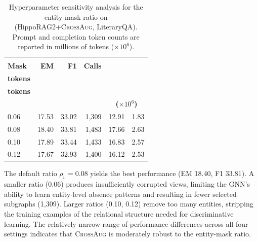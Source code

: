 \documentclass[11pt]{article}
\newcommand{\ours}{\textsc{CrossAug}\xspace}
\begin{document}
\begin{table}[!htbp]
\centering
\footnotesize
\setlength{\tabcolsep}{3pt}
\begin{tabular*}{\columnwidth}{@{\extracolsep{\fill}}lrrrrr@{}}
\toprule
\begin{tabular}[c]{@{}c@{}}\textbf{Entity}\\\textbf{Mask}\end{tabular} &
\textbf{EM} & \textbf{F1} & \textbf{Calls} &
\begin{tabular}[c]{@{}c@{}}\textbf{Prompt}\\\textbf{tokens}\end{tabular} &
\begin{tabular}[c]{@{}c@{}}\textbf{Completion}\\\textbf{tokens}\end{tabular} \\
 & & & & \multicolumn{2}{c}{\textbf{($\times 10^6$)}} \\
\midrule
0.06 & 17.53 & 33.02 & 1,309 & 12.91 & 1.83 \\
0.08 & 18.40 & 33.81 & 1,483 & 17.66 & 2.63 \\
0.10 & 17.89 & 33.44 & 1,433 & 16.83 & 2.57 \\
0.12 & 17.67 & 32.93 & 1,400 & 16.12 & 2.53 \\
\bottomrule
\end{tabular*}
\caption{Hyperparameter sensitivity analysis for the entity-mask ratio on (HippoRAG2+\ours, LiteraryQA). Prompt and completion token counts are reported in millions of tokens ($\times 10^6$).}
\label{tab:entity-mask-sensitivity}
\end{table}

The default ratio $\rho_v{=}0.08$ yields the best performance (EM 18.40, F1 33.81). A smaller ratio (0.06) produces insufficiently corrupted views, limiting the GNN's ability to learn entity-level absence patterns and resulting in fewer selected subgraphs (1,309). Larger ratios (0.10, 0.12) remove too many entities, stripping the training examples of the relational structure needed for discriminative learning. The relatively narrow range of performance differences across all four settings indicates that \ours is moderately robust to the entity-mask ratio.
\end{document}
